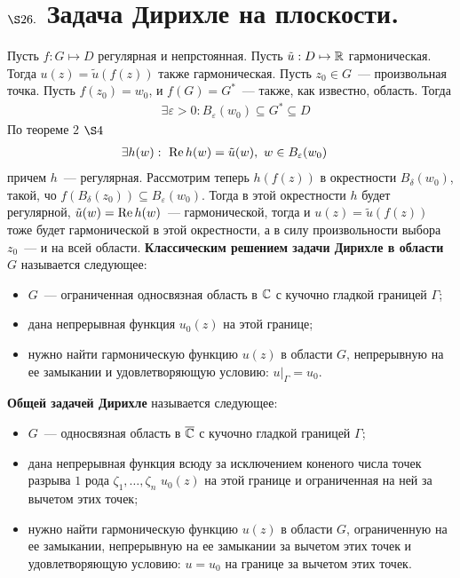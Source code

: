 \section{$\S 26.$ Задача Дирихле на плоскости.}
\theorem
Пусть $f: G \mapsto D$ регулярная и непрстоянная. Пусть $\tilde{u}: D \mapsto
\mathbb{R}$ гармоническая. Тогда $u(z) = \tilde{u}(f(z))$ также гармоническая.
\pr
Пусть $z_0 \in G$~--- произвольная точка. Пусть $f(z_0) = w_0$, и $f(G) =
G^*$~--- также, как известно, область. Тогда
\begin{align*}
  & \exists \varepsilon > 0: B_\varepsilon(w_0) \subseteq G^* \subseteq D
\end{align*}
По теореме $2$ $\S 4$
\begin{align*}
  & \exists h(w): \ \mathrm{Re}\, h(w) = \tilde{u}(w), \ w \in B_\varepsilon(w_0)
\end{align*}
причем $h$~--- регулярная. Рассмотрим теперь $h(f(z))$ в окрестности
$B_\delta(w_0)$, такой, чо $f\left( B_\delta(z_0) \right) \subseteq
B_\varepsilon(w_0)$. Тогда в этой окрестности $h$ будет регулярной,
$\tilde{u}(w) = \mathrm{Re}\, h(w)$~--- гармонической, тогда и $u(z) = \tilde{u}(f(z))$
тоже будет гармонической в этой окрестности, а в силу произвольности выбора
$z_0$~--- и на всей области.
\Def
\textbf{Классическим решением задачи Дирихле в области $G$} называется
следующее:
\begin{itemize}
    \item $G$~--- ограниченная односвязная область в $\mathbb{C}$ с кучочно гладкой
    границей $\Gamma$;
    \item дана непрерывная функция $u_0(z)$ на этой границе;
    \item нужно найти гармоническую функцию $u(z)$ в области $G$, непрерывную на
    ее замыкании и удовлетворяющую условию: $u\Big|_\Gamma = u_0$.
\end{itemize}
\Def
\textbf{Общей задачей Дирихле} называется следующее:
\begin{itemize}
    \item $G$~--- односвязная область в $\overline{\mathbb{C}}$ с кучочно гладкой границей $\Gamma$;
    \item дана непрерывная функция всюду за исключением коненого числа точек
    разрыва $1$ рода $\zeta_1, \dots, \zeta_n$ $u_0(z)$ на этой границе и
    ограниченная на ней за вычетом этих точек;
    \item нужно найти гармоническую функцию $u(z)$ в области $G$, ограниченную
    на ее замыкании, непрерывную на ее замыкании за вычетом этих точек и
    удовлетворяющую условию: $u = u_0$ на границе за вычетом этих точек.
\end{itemize}
